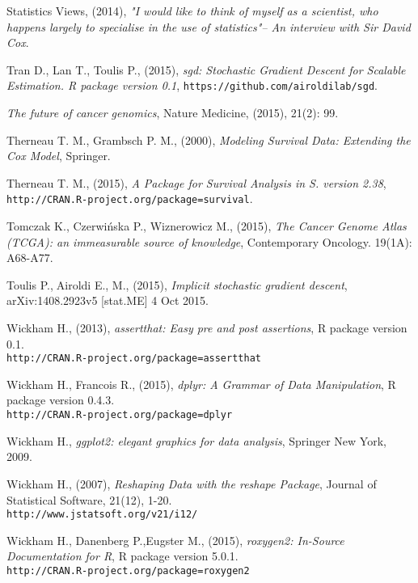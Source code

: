 \begin{thebibliography}{99}
 Statistics Views, (2014), \textit{ "I would like to think of myself as a scientist, who happens largely to specialise in the use of statistics"– An interview with Sir David Cox}.

 Tran D., Lan T., Toulis P., (2015), \textit{sgd: Stochastic Gradient Descent for Scalable Estimation. R package version 0.1}, \texttt{https://github.com/airoldilab/sgd}.


 \textit{The future of cancer genomics}, Nature Medicine, (2015), 21(2): 99.

 Therneau T. M., Grambsch P. M., (2000), \textit{Modeling Survival Data: Extending the Cox Model}, Springer.

 Therneau T. M., (2015), \textit{A Package for Survival Analysis in S. version 2.38}, \\ \texttt{http://CRAN.R-project.org/package=survival}.


 Tomczak K., Czerwińska P., Wiznerowicz M., (2015), \textit{The Cancer Genome Atlas (TCGA): an immeasurable source of knowledge}, Contemporary Oncology. 19(1A): A68-A77.


 Toulis P.,Airoldi E., M., (2015), \textit{Implicit stochastic gradient descent}, arXiv:1408.2923v5 [stat.ME] 4 Oct 2015.


 Wickham H., (2013), \textit{assertthat: Easy pre and post assertions}, R package version 0.1. \\ \texttt{http://CRAN.R-project.org/package=assertthat}

  Wickham H., Francois R., (2015), \textit{dplyr: A Grammar of Data Manipulation}, R package version 0.4.3. \\  \texttt{http://CRAN.R-project.org/package=dplyr}

 Wickham H., \textit{ggplot2: elegant graphics for data analysis}, Springer New York, 2009.

 Wickham H., (2007), \textit{Reshaping Data with the reshape Package}, Journal of Statistical Software, 21(12), 1-20. \\ \texttt{http://www.jstatsoft.org/v21/i12/}


 Wickham H., Danenberg P.,Eugster M., (2015), \textit{roxygen2: In-Source Documentation for R}, R package version 5.0.1. \\
\texttt{http://CRAN.R-project.org/package=roxygen2}



\end{thebibliography}
